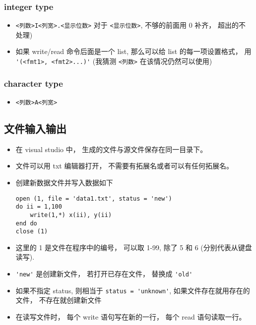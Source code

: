 \subsubsection{integer type}
\begin{itemize}
\item \verb|<列数>I<列宽>.<显示位数>|  对于 \verb|<显示位数>|, 不够的前面用 0 补齐， 超出的不
   处理)
\item 如果 write/read 命令后面是一个 list, 那么可以给 list 的每一项设置格式， 用 \verb|'(<fmt1>, <fmt2>...)'|  (我猜测 \verb|<列数>| 在该情况仍然可以使用)
\end{itemize}

\subsubsection{character type}
\begin{itemize}
\item \verb|<列数>A<列宽>|
\end{itemize}

\subsection{文件输入输出}
\begin{itemize}
\item 在 visual studio 中， 生成的文件与源文件保存在同一目录下。
\item 文件可以用 txt 编辑器打开， 不需要有拓展名或者可以有任何拓展名。
\item 创建新数据文件并写入数据如下
\begin{lstlisting}[language=none]
open (1, file = 'data1.txt', status = 'new')
do ii = 1,100
	write(1,*) x(ii), y(ii)
end do
close (1)
\end{lstlisting}
\item 这里的 1 是文件在程序中的编号， 可以取 1-99, 除了 5 和 6 (分别代表从键盘读写).
\item \verb|'new'| 是创建新文件， 若打开已存在文件， 替换成 \verb|'old'|
\item 如果不指定 status, 则相当于 \verb|status = 'unknown'|, 如果文件存在就用存在的文件， 不存在就创建新文件
\item 在读写文件时， 每个 write 语句写在新的一行， 每个 read 语句读取一行。
\end{itemize}


